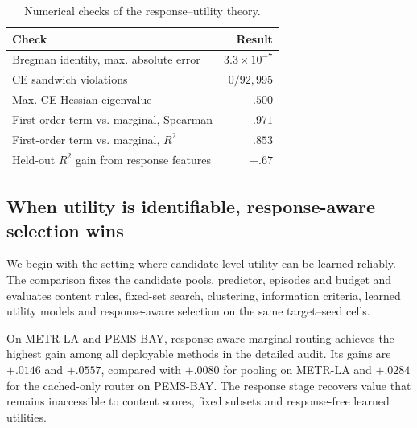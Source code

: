 \begin{table}[t]
 \centering
 \small
 \caption{Numerical checks of the response--utility theory.}
 \label{tab:theory-validation}
 \begin{tabular}{lr}
  \toprule
  Check & Result\\
  \midrule
  Bregman identity, max. absolute error & $3.3\times10^{-7}$\\
  CE sandwich violations & $0/92{,}995$\\
  Max. CE Hessian eigenvalue & $.500$\\
  First-order term vs. marginal, Spearman & $.971$\\
  First-order term vs. marginal, $R^2$ & $.853$\\
  Held-out $R^2$ gain from response features & $+.67$\\
  \bottomrule
 \end{tabular}
\end{table}

\subsection{When utility is identifiable, response-aware selection wins}

We begin with the setting where candidate-level utility can be learned
reliably. The comparison fixes the candidate pools, predictor, episodes and
budget and evaluates content rules, fixed-set search, clustering, information
criteria, learned utility models and response-aware selection on the same
target--seed cells.

On METR-LA and PEMS-BAY, response-aware marginal routing achieves the highest
gain among all deployable methods in the detailed audit. Its gains are
$+.0146$ and $+.0557$, compared with $+.0080$ for pooling on METR-LA and
$+.0284$ for the cached-only router on PEMS-BAY. The response stage recovers value that remains inaccessible to content scores,
fixed subsets and response-free learned utilities.

